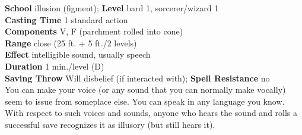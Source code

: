 \textbf{School} illusion (figment); \textbf{Level} bard 1, sorcerer/wizard 1\\
\textbf{Casting Time} 1 standard action\\
\textbf{Components} V, F (parchment rolled into cone)\\
\textbf{Range} close (25 ft. + 5 ft./2 levels)\\
\textbf{Effect} intelligible sound, usually speech\\
\textbf{Duration} 1 min./level (D)\\
\textbf{Saving Throw }Will disbelief (if interacted with); \textbf{Spell Resistance} no\\
You can make your voice (or any sound that you can normally make vocally) seem to issue from someplace else. You can speak in any language you know. With respect to such voices and sounds, anyone who hears the sound and rolls a successful save recognizes it as illusory (but still hears it).\\
